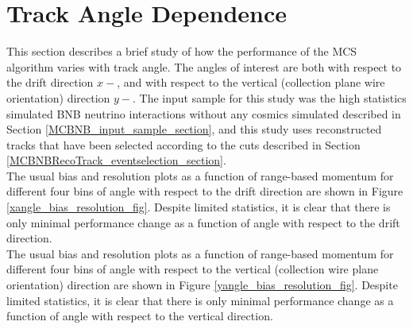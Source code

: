 \section{Track Angle Dependence}\label{AngleStudy_MCBNBRecoTrack_section}
This section describes a brief study of how the performance of the MCS algorithm varies with track angle. The angles of interest are both with respect to the drift direction $x-$, and with respect to the vertical (collection plane wire orientation) direction $y-$. The input sample for this study was the high statistics simulated BNB neutrino interactions without any cosmics simulated described in Section \ref{MCBNB_input_sample_section}, and this study uses reconstructed tracks that have been selected according to the cuts described in Section \ref{MCBNBRecoTrack_eventselection_section}.\\

The usual bias and resolution plots as a function of range-based momentum for different four bins of angle with respect to the drift direction are shown in Figure \ref{xangle_bias_resolution_fig}. Despite limited statistics, it is clear that there is only minimal performance change as a function of angle with respect to the drift direction.\\

The usual bias and resolution plots as a function of range-based momentum for different four bins of angle with respect to the vertical (collection wire plane orientation) direction are shown in Figure \ref{yangle_bias_resolution_fig}. Despite limited statistics, it is clear that there is only minimal performance change as a function of angle with respect to the vertical direction.\\



